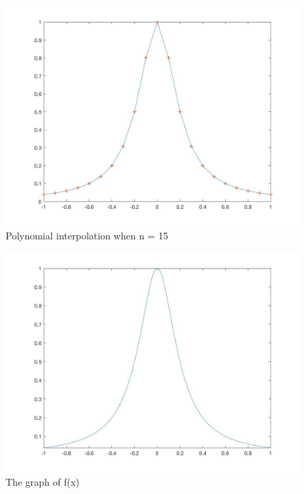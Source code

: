 \documentclass{article}
\begin{document}
\begin{figure}[H]
\centering
\caption{Polynomial interpolation when n = 15}
\includegraphics[scale=0.4]{Problem_3_n=15}
\end{figure}

\begin{figure}[H]
\centering
\caption{The graph of f(x)}
\includegraphics[scale=0.4]{Problem_3_actual}
\end{figure}
\end{document}
